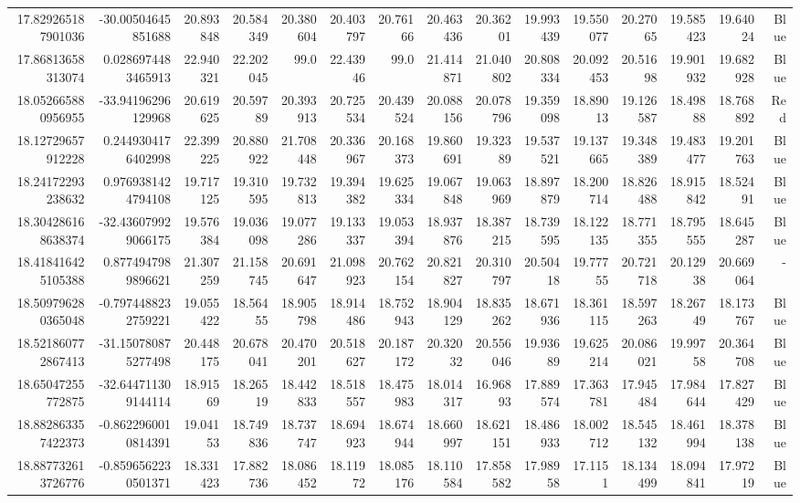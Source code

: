 \begin{center}
\begin{longtable}{rrrrrrrrrrrrrrr}
17.829265187901036 & -30.00504645851688 & 20.893848 & 20.584349 & 20.380604 & 20.403797 & 20.76166 & 20.463436 & 20.36201 & 19.993439 & 19.550077 & 20.27065 & 19.585423 & 19.64024 & Blue \\
17.86813658313074 & 0.0286974483465913 & 22.940321 & 22.202045 & 99.0 & 22.43946 & 99.0 & 21.414871 & 21.040802 & 20.808334 & 20.092453 & 20.51698 & 19.901932 & 19.682928 & Blue \\
18.052665880956955 & -33.94196296129968 & 20.619625 & 20.59789 & 20.393913 & 20.725534 & 20.439524 & 20.088156 & 20.078796 & 19.359098 & 18.89013 & 19.126587 & 18.49888 & 18.768892 & Red \\
18.12729657912228 & 0.2449304176402998 & 22.399225 & 20.880922 & 21.708448 & 20.336967 & 20.168373 & 19.860691 & 19.32389 & 19.537521 & 19.137665 & 19.348389 & 19.483477 & 19.201763 & Blue \\
18.24172293238632 & 0.9769381424794108 & 19.717125 & 19.310595 & 19.732813 & 19.394382 & 19.625334 & 19.067848 & 19.063969 & 18.897879 & 18.200714 & 18.826488 & 18.915842 & 18.52491 & Blue \\
18.304286168638374 & -32.436079929066175 & 19.576384 & 19.036098 & 19.077286 & 19.133337 & 19.053394 & 18.937876 & 18.387215 & 18.739595 & 18.122135 & 18.771355 & 18.795555 & 18.645287 & Blue \\
18.418416425105388 & 0.8774947989896621 & 21.307259 & 21.158745 & 20.691647 & 21.098923 & 20.762154 & 20.821827 & 20.310797 & 20.50418 & 19.77755 & 20.721718 & 20.12938 & 20.669064 & - \\
18.509796280365048 & -0.7974488232759221 & 19.055422 & 18.56455 & 18.905798 & 18.914486 & 18.752943 & 18.904129 & 18.835262 & 18.671936 & 18.361115 & 18.597263 & 18.26749 & 18.173767 & Blue \\
18.521860772867413 & -31.150780875277498 & 20.448175 & 20.678041 & 20.470201 & 20.518627 & 20.187172 & 20.32032 & 20.556046 & 19.93689 & 19.625214 & 20.086021 & 19.99758 & 20.364708 & Blue \\
18.65047255772875 & -32.644711309144114 & 18.91569 & 18.26519 & 18.442833 & 18.518557 & 18.475983 & 18.014317 & 16.96893 & 17.889574 & 17.363781 & 17.945484 & 17.984644 & 17.827429 & Blue \\
18.882863357422373 & -0.8622960010814391 & 19.04153 & 18.749836 & 18.737747 & 18.694923 & 18.674944 & 18.660997 & 18.621151 & 18.486933 & 18.002712 & 18.545132 & 18.461994 & 18.378138 & Blue \\
18.887732613726776 & -0.8596562230501371 & 18.331423 & 17.882736 & 18.086452 & 18.11972 & 18.085176 & 18.110584 & 17.858582 & 17.98958 & 17.1151 & 18.134499 & 18.094841 & 17.97219 & Blue \\

\end{longtable}
\end{center}
